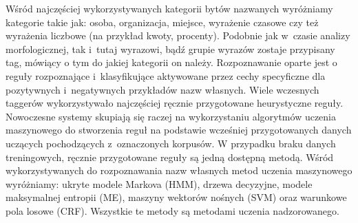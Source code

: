 \documentclass[a4paper, twoside, 12pt]{report}
\begin{document}
                Wśród najczęściej wykorzystywanych kategorii bytów nazwanych wyróżniamy kategorie
                takie jak: osoba, organizacja, miejsce, wyrażenie czasowe czy też wyrażenia liczbowe (na przykład kwoty, procenty).
                Podobnie jak w~czasie analizy morfologicznej, tak i~tutaj wyrazowi, bądź grupie wyrazów zostaje przypisany
                tag, mówiący o tym do jakiej kategorii on należy. Rozpoznawanie oparte jest o reguły rozpoznające i~klasyfikujące
                aktywowane przez cechy specyficzne dla pozytywnych i~negatywnych przykładów nazw własnych. Wiele wczesnych
                taggerów wykorzystywało najczęściej ręcznie przygotowane heurystyczne reguły. Nowoczesne systemy skupiają się
                raczej na wykorzystaniu algorytmów uczenia maszynowego do stworzenia reguł na podstawie wcześniej przygotowanych
                danych uczących pochodzących z~oznaczonych korpusów. W przypadku braku danych treningowych, ręcznie przygotowane
                reguły są jedną dostępną metodą. Wśród wykorzystywanych do rozpoznawania nazw własnych metod uczenia maszynowego
                wyróżniamy: ukryte modele Markova (HMM), drzewa decyzyjne, modele maksymalnej entropii (ME), maszyny wektorów nośnych (SVM)
                oraz warunkowe pola losowe (CRF). Wszystkie te metody są metodami uczenia nadzorowanego\cite{NERSURVEY}.
\end{document}
